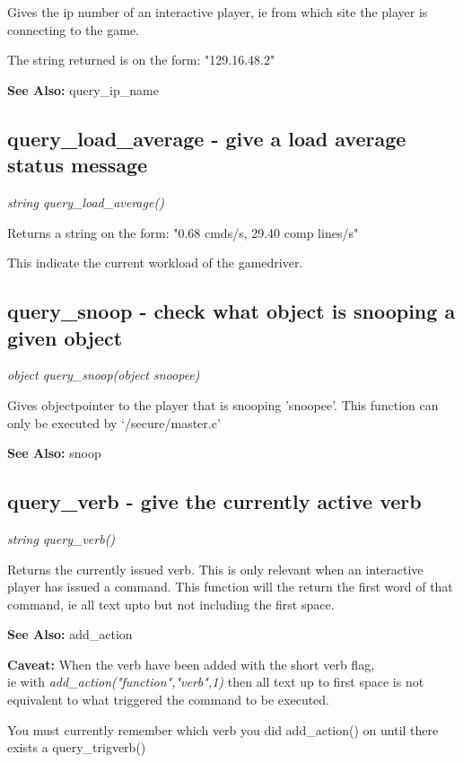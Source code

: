     Gives the ip number of an interactive player, ie from which site
    the player is connecting to the game.
    
    The string returned is on the form: "129.16.48.2"

    {\bf See Also: }    query\_ip\_name


\subsection{query\_load\_average - give a load average status message}

    {\em string query\_load\_average()}

    Returns a string on the form:
        "0.68 cmds/s, 29.40 comp lines/s"

    This indicate the current workload of the gamedriver.


\subsection{query\_snoop - check what object is snooping a given object}

    {\em object query\_snoop(object snoopee)        }
    
    Gives objectpointer to the player that is snooping 'snoopee'. This
    function can only be executed by `/secure/master.c'

    {\bf See Also: }    snoop


\subsection{query\_verb - give the currently active verb}

    {\em string query\_verb()}

    Returns the currently issued verb. This is only relevant when an
    interactive player has issued a command. This function will
    the return the first word of that command, ie all text upto but
    not including the first space.

    {\bf See Also: }    add\_action

    {\bf Caveat: }  When the verb have been added with the short verb flag, \\
                ie with {\em add\_action("function","verb",1)}
    then all text up to first space is not equivalent to what triggered
    the command to be executed.

    You must currently remember which verb you did add\_action() on
    until there exists a query\_trigverb()
    
